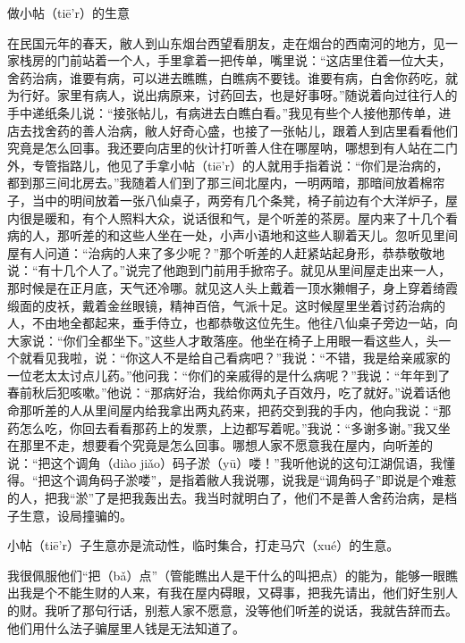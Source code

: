 \documentclass[12pt,UTF8]{ctexbook}
\begin{document}
做小帖（tiē'r）的生意


在民国元年的春天，敝人到山东烟台西望看朋友，走在烟台的西南河的地方，见一家栈房的门前站着一个人，手里拿着一把传单，嘴里说：“这店里住着一位大夫，舍药治病，谁要有病，可以进去瞧瞧，白瞧病不要钱。谁要有病，白舍你药吃，就为行好。家里有病人，说出病原来，讨药回去，也是好事呀。”随说着向过往行人的手中递纸条儿说：“接张帖儿，有病进去白瞧白看。”我见有些个人接他那传单，进店去找舍药的善人治病，敝人好奇心盛，也接了一张帖儿，跟着人到店里看看他们究竟是怎么回事。我还要向店里的伙计打听善人住在哪屋呐，哪想到有人站在二门外，专管指路儿，他见了手拿小帖（tiē'r）的人就用手指着说：“你们是治病的，都到那三间北房去。”我随着人们到了那三间北屋内，一明两暗，那暗间放着棉帘子，当中的明间放着一张八仙桌子，两旁有几个条凳，椅子前边有个大洋炉子，屋内很是暖和，有个人照料大众，说话很和气，是个听差的茶房。屋内来了十几个看病的人，那听差的和这些人坐在一处，小声小语地和这些人聊着天儿。忽听见里间屋有人问道：“治病的人来了多少呢？”那个听差的人赶紧站起身形，恭恭敬敬地说：“有十几个人了。”说完了他跑到门前用手掀帘子。就见从里间屋走出来一人，那时候是在正月底，天气还冷哪。就见这人头上戴着一顶水獭帽子，身上穿着绮霞缎面的皮袄，戴着金丝眼镜，精神百倍，气派十足。这时候屋里坐着讨药治病的人，不由地全都起来，垂手侍立，也都恭敬这位先生。他往八仙桌子旁边一站，向大家说：“你们全都坐下。”这些人才敢落座。他坐在椅子上用眼一看这些人，头一个就看见我啦，说：“你这人不是给自己看病吧？”我说：“不错，我是给亲戚家的一位老太太讨点儿药。”他问我：“你们的亲戚得的是什么病呢？”我说：“年年到了春前秋后犯咳嗽。”他说：“那病好治，我给你两丸子百效丹，吃了就好。”说着话他命那听差的人从里间屋内给我拿出两丸药来，把药交到我的手内，他向我说：“那药怎么吃，你回去看看那药上的发票，上边都写着呢。”我说：“多谢多谢。”我又坐在那里不走，想要看个究竟是怎么回事。哪想人家不愿意我在屋内，向听差的说：“把这个调角（diào jiǎo）码子淤（yū）喽！”我听他说的这句江湖侃语，我懂得。“把这个调角码子淤喽”，是指着敝人我说哪，说我是“调角码子”即说是个难惹的人，把我“淤”了是把我轰出去。我当时就明白了，他们不是善人舍药治病，是档子生意，设局撞骗的。

小帖（tiē'r）子生意亦是流动性，临时集合，打走马穴（xué）的生意。



我很佩服他们“把（bǎ）点”（管能瞧出人是干什么的叫把点）的能为，能够一眼瞧出我是个不能生财的人来，有我在屋内碍眼，又碍事，把我先请出，他们好生别人的财。我听了那句行话，别惹人家不愿意，没等他们听差的说话，我就告辞而去。他们用什么法子骗屋里人钱是无法知道了。
\end{document}
